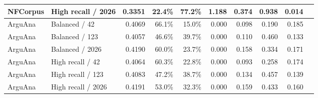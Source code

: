 \begin{table}[!htbp]
\begin{tabular}{llrrrrrrrr}
NFCorpus & High recall / 2026 & 0.3351 & 22.4\% & 77.2\% & 1.188 & 0.374 & 0.938 & 0.014 \\
\midrule
ArguAna & Balanced / 42 & 0.4069 & 66.1\% & 15.0\% & 0.000 & 0.098 & 0.190 & 0.185 \\
ArguAna & Balanced / 123 & 0.4057 & 46.6\% & 39.7\% & 0.000 & 0.110 & 0.460 & 0.133 \\
ArguAna & Balanced / 2026 & 0.4190 & 60.0\% & 23.7\% & 0.000 & 0.158 & 0.334 & 0.171 \\
ArguAna & High recall / 42 & 0.4064 & 60.3\% & 22.8\% & 0.000 & 0.093 & 0.258 & 0.174 \\
ArguAna & High recall / 123 & 0.4083 & 47.2\% & 38.7\% & 0.000 & 0.134 & 0.457 & 0.139 \\
ArguAna & High recall / 2026 & 0.4191 & 53.0\% & 32.3\% & 0.000 & 0.159 & 0.433 & 0.160 \\
\bottomrule
\end{tabular}
\end{table}
